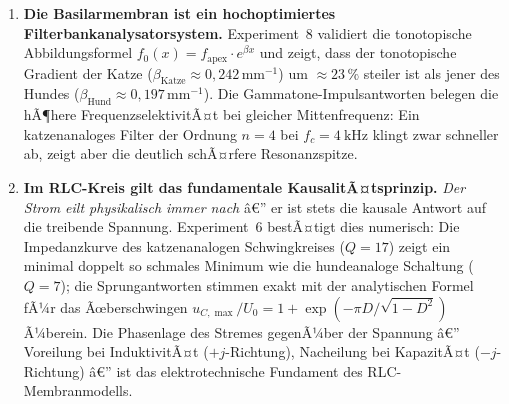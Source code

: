 ﻿\documentclass[12pt,a4paper,titlepage]{report}
\begin{document}
\begin{enumerate}[leftmargin=2em, label=\textbf{\arabic{enumi}.}]
	\item \textbf{Die Basilarmembran ist ein hochoptimiertes Filterbankanalysatorsystem.}
		Experiment~8 validiert die tonotopische Abbildungsformel
		$f_0(x)=f_{\mathrm{apex}}\cdot e^{\beta x}$ und zeigt,
		dass der tonotopische Gradient der Katze
		($\beta_{\mathrm{Katze}}\approx0{,}242\,\mathrm{mm}^{-1}$)
		um $\approx23\,\%$ steiler ist als jener des Hundes
		($\beta_{\mathrm{Hund}}\approx0{,}197\,\mathrm{mm}^{-1}$).
		Die Gammatone-Impulsantworten belegen die hÃ¶here FrequenzselektivitÃ¤t
		bei gleicher Mittenfrequenz: Ein katzenanaloges Filter der
		Ordnung $n=4$ bei $f_c=\SI{4}{\kilo\hertz}$ klingt zwar schneller ab,
		zeigt aber die deutlich schÃ¤rfere Resonanzspitze.

	\item \textbf{Im RLC-Kreis gilt das fundamentale KausalitÃ¤tsprinzip.}
		\emph{Der Strom eilt physikalisch immer nach} â€” er ist stets
		die kausale Antwort auf die treibende Spannung.
		Experiment~6 bestÃ¤tigt dies numerisch: Die Impedanzkurve
		des katzenanalogen Schwingkreises ($Q=17$) zeigt ein
		minimal doppelt so schmales Minimum wie die hunde\-analoge
		Schaltung ($Q=7$); die Sprungantworten stimmen exakt mit
		der analytischen Formel fÃ¼r das Ãœberschwingen
		$u_{C,\max}/U_0=1+\exp(-\pi D/\sqrt{1-D^2})$ Ã¼berein.
		Die Phasenlage des Stremes gegenÃ¼ber der Spannung â€”
		Voreilung bei InduktivitÃ¤t ($+j$-Richtung), Nacheilung bei
		KapazitÃ¤t ($-j$-Richtung) â€” ist das elektrotechnische
		Fundament des RLC-Membranmodells.


\end{enumerate}
\end{document}
